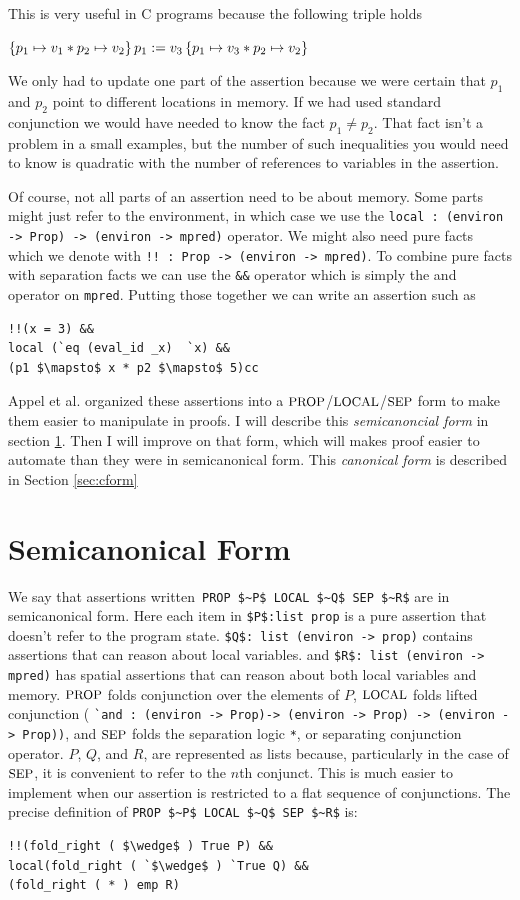 \documentclass{puthesis}
\begin{document}
This is very useful in C programs because the following triple holds

$\{p_1 \mapsto v_1 * p_2 \mapsto v_2\}\,p_1 := v_3\,\{p_1 \mapsto v_3 * p_2 \mapsto v_2\}$

We only had to update one part of the assertion because we were
certain that $p_1$ and $p_2$ point to different locations in memory. If
we had used standard conjunction we would have needed to know the fact
$p_1 \neq p_2$. That fact isn't a problem in a small examples, but the
number of such inequalities you would need to know is quadratic with
the number of references to variables in the assertion. 

Of course, not all parts of an assertion need to be about memory. Some
parts might just refer to the environment, in which case we use the
\lstinline|local : (environ -> Prop) -> (environ -> mpred)|
operator. We might also need pure facts which we denote with
\lstinline|!! : Prop -> (environ -> mpred)|. To combine pure facts
with separation facts we can use the \lstinline|&&| operator which is simply the
and operator on \lstinline|mpred|. Putting those together we can write
an assertion such as

\begin{lstlisting}
!!(x = 3) &&
local (`eq (eval_id _x)  `x) &&
(p1 $\mapsto$ x * p2 $\mapsto$ 5)cc
\end{lstlisting}

Appel et al. organized these assertions into a $\mbox{\small PROP}$/$\mbox{\small LOCAL}$/$\mbox{\small SEP}$
form to make them easier to manipulate in proofs. I will describe this
\emph{semicanoncial form} in section \ref{sec:scform}. Then I will
improve on that form, which will makes proof easier to automate than
they were in semicanonical form. This \emph{canonical form} is
described in Section \ref{sec:cform}

\section{Semicanonical Form}
\label{sec:scform}
We say that assertions written~\lstinline{PROP $~P$ LOCAL $~Q$ SEP $~R$}  
are in semicanonical form. Here each item in
\lstinline|$P$:list prop| is a pure assertion that doesn't refer to
the program state. \lstinline|$Q$: list (environ -> prop)| contains
assertions that can reason about local variables.  and 
\lstinline|$R$: list (environ -> mpred)| has spatial assertions that can reason about
both local variables and memory.  $\mbox{\small PROP}$ folds conjunction over the
elements of $P$, $\mbox{\small LOCAL}$ folds lifted conjunction ( 
\lstinline|`and : (environ -> Prop)-> (environ -> Prop) -> (environ -> Prop))|, and
$\mbox{\small SEP}$ folds the separation logic \lstinline|*|, or separating
conjunction operator. $P$, $Q$, and $R$, are represented as lists
because, particularly in the case of $\mbox{\small SEP}$, it is convenient to refer
to the $n$th conjunct. This is much easier to implement when our
assertion is restricted to a flat sequence of conjunctions. The
precise definition of \lstinline{PROP $~P$ LOCAL $~Q$ SEP $~R$} is:
\pagebreak
\begin{lstlisting}
!!(fold_right ( $\wedge$ ) True P) &&
local(fold_right ( `$\wedge$ ) `True Q) &&
(fold_right ( * ) emp R)
\end{lstlisting}
\end{document}
